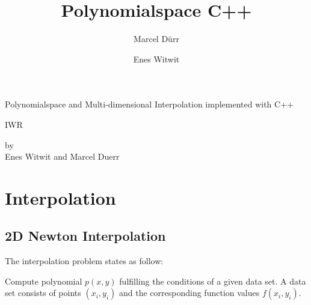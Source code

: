 \documentclass[a4paper,12pt]{report}
\begin{document}
\titleformat{\chapter}[block]{\bf\huge}{\thechapter}{2pc}{}

\title{Polynomialspace C++}

\author{Marcel Dürr \and Enes Witwit}

\pagestyle{empty}




\begin{titlepage}

\begin{center} 
{\Huge Polynomialspace and Multi-dimensional Interpolation implemented with C++}
\vspace*{1cm}

{\Large IWR}
\vspace*{1.5cm}

by \\[0.5cm]

{\Large Enes Witwit and Marcel Duerr}
\vspace*{1.5cm}

\end{center}
\end{titlepage}
\tableofcontents
\newpage
\chapter{Interpolation}
\section{2D Newton Interpolation}
The interpolation problem states as follow:
\begin{framed}
Compute polynomial $p(x,y)$ fulfilling the conditions of a given data set. A data set consists of points $(x_{i},y_{i})$ and the corresponding function values $f(x_{i},y_{i})$. 
\end{framed}
\end{document}
